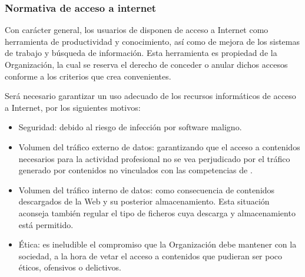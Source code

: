 
\subsubsection{Normativa de acceso a internet}

Con carácter general, los usuarios de \Beneficiario{} disponen de acceso a Internet como herramienta de productividad y conocimiento, así como de mejora de los sistemas de trabajo y búsqueda de información. Esta herramienta es propiedad de la Organización, la cual se reserva el derecho de conceder o anular dichos accesos conforme a los criterios que crea convenientes.

Será necesario garantizar un uso adecuado de los recursos informáticos de acceso a Internet, por los siguientes motivos:

\begin{itemize}
    \item Seguridad: debido al riesgo de infección por software maligno.
    \item Volumen del tráfico externo de datos: garantizando que el acceso a contenidos necesarios para la actividad profesional no se vea perjudicado por el tráfico generado por contenidos no vinculados con las competencias de \Beneficiario{}.
    \item Volumen del tráfico interno de datos: como consecuencia de contenidos descargados de la Web y su posterior almacenamiento. Esta situación aconseja también regular el tipo de ficheros cuya descarga y almacenamiento está permitido.
    \item Ética: es ineludible el compromiso que la Organización debe mantener con la sociedad, a la hora de vetar el acceso a contenidos que pudieran ser poco éticos, ofensivos o delictivos.
\end{itemize}

